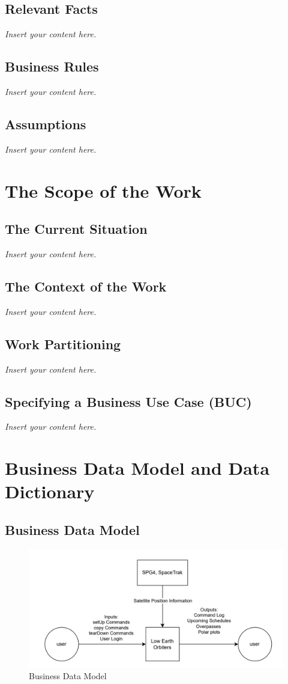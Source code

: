 \documentclass[12pt]{article}
\newcommand{\lips}{\textit{Insert your content here.}}
\begin{document}
\subsection{Relevant Facts}
\lips
\subsection{Business Rules}
\lips
\subsection{Assumptions}
\lips

\section{The Scope of the Work}
\subsection{The Current Situation}
\lips
\subsection{The Context of the Work}
\lips
\subsection{Work Partitioning}
\lips
\subsection{Specifying a Business Use Case (BUC)}
\lips

\section{Business Data Model and Data Dictionary}
\subsection{Business Data Model}
\begin{figure}[H] %
    \centering %
    \includegraphics[width=0.8\linewidth]{systemcontext.png} %
    \caption{Business Data Model} %
    \label{fig:systemcontext} %
\end{figure}
\end{document}
